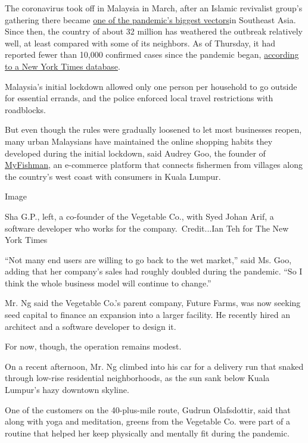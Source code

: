The coronavirus took off in Malaysia in March, after an Islamic
revivalist group's gathering there became
\href{https://www.nytimes3xbfgragh.onion/2020/03/20/world/asia/coronavirus-malaysia-muslims-outbreak.html}{one
of the pandemic's biggest vectors}in Southeast Asia. Since then, the
country of about 32 million has weathered the outbreak relatively well,
at least compared with some of its neighbors. As of Thursday, it had
reported fewer than 10,000 confirmed cases since the pandemic began,
\href{https://www.nytimes3xbfgragh.onion/interactive/2020/world/coronavirus-maps.html\#countries}{according
to a New York Times database}.

Malaysia's initial lockdown allowed only one person per household to go
outside for essential errands, and the police enforced local travel
restrictions with roadblocks.

But even though the rules were gradually loosened to let most businesses
reopen, many urban Malaysians have maintained the online shopping habits
they developed during the initial lockdown, said Audrey Goo, the founder
of \href{https://myfishman.com/}{MyFishman}, an e-commerce platform that
connects fishermen from villages along the country's west coast with
consumers in Kuala Lumpur.

Image

Sha G.P., left, a co-founder of the Vegetable Co., with Syed Johan Arif,
a software developer who works for the company.~Credit...Ian Teh for The
New York Times

``Not many end users are willing to go back to the wet market,'' said
Ms. Goo, adding that her company's sales had roughly doubled during the
pandemic. ``So I think the whole business model will continue to
change.''

Mr. Ng said the Vegetable Co.'s parent company, Future Farms, was now
seeking seed capital to finance an expansion into a larger facility. He
recently hired an architect and a software developer to design it.

For now, though, the operation remains modest.

On a recent afternoon, Mr. Ng climbed into his car for a delivery run
that snaked through low-rise residential neighborhoods, as the sun sank
below Kuala Lumpur's hazy downtown skyline.

One of the customers on the 40-plus-mile route, Gudrun Olafsdottir, said
that along with yoga and meditation, greens from the Vegetable Co. were
part of a routine that helped her keep physically and mentally fit
during the pandemic.

